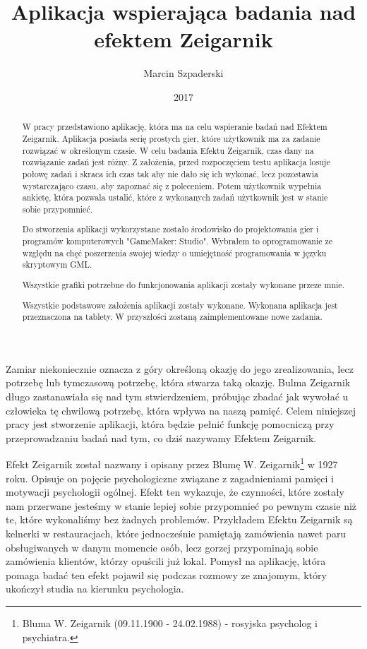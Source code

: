\documentclass[openright]{xmgr}
\author   {Marcin Szpaderski}
\title    {Aplikacja wspierająca badania nad efektem Zeigarnik}
\date     {2017}
\begin{document}
\begin{abstract}
W pracy przedstawiono aplikację, która ma na celu wspieranie badań nad Efektem Zeigarnik. Aplikacja posiada serię prostych gier, które użytkownik ma za zadanie rozwiązać w określonym czasie. W celu badania Efektu Zeigarnik, czas dany na rozwiązanie zadań jest różny. Z założenia, przed rozpoczęciem testu aplikacja losuje połowę zadań i skraca ich czas tak aby nie dało się ich wykonać, lecz pozostawia wystarczająco czasu, aby zapoznać się z poleceniem. Potem użytkownik wypełnia ankietę, która pozwala ustalić, które z wykonanych zadań użytkownik jest w stanie sobie przypomnieć.

Do stworzenia aplikacji wykorzystane zostało środowisko do projektowania gier i programów komputerowych "GameMaker: Studio".  Wybrałem to oprogramowanie ze względu na chęć poszerzenia swojej wiedzy o umiejętność programowania w języku skryptowym GML. 

Wszystkie grafiki potrzebne do funkcjonowania aplikacji zostały wykonane przeze mnie.

Wszystkie podstawowe założenia aplikacji zostały wykonane. Wykonana aplikacja jest przeznaczona na tablety. W przyszłości zostaną zaimplementowane nowe zadania.


\end{abstract}


\maketitle

\introduction

Zamiar niekoniecznie oznacza z góry określoną okazję do jego zrealizowania, lecz potrzebę lub tymczasową potrzebę, która stwarza taką okazję. Bulma Zeigarnik długo zastanawiała się nad tym stwierdzeniem, próbując zbadać jak wywołać u człowieka tę chwilową potrzebę, która wpływa na naszą pamięć. Celem niniejszej pracy jest stworzenie aplikacji, która będzie pełnić funkcję pomocniczą przy przeprowadzaniu badań nad tym, co dziś nazywamy Efektem Zeigarnik.

Efekt Zeigarnik został nazwany i opisany przez Blumę W. Zeigarnik\footnote{Bluma W. Zeigarnik (09.11.1900 - 24.02.1988) - rosyjska psycholog i psychiatra.} w 1927 roku. Opisuje on pojęcie psychologiczne związane z zagadnieniami pamięci i motywacji psychologii ogólnej. Efekt ten wykazuje, że czynności, które zostały nam przerwane jesteśmy w stanie lepiej sobie przypomnieć po pewnym czasie niż te, które wykonaliśmy bez żadnych problemów. Przykładem Efektu Zeigarnik są kelnerki w restauracjach, które jednocześnie pamiętają zamówienia nawet paru obsługiwanych w danym momencie osób, lecz gorzej przypominają sobie zamówienia klientów, którzy opuścili już lokal. Pomysł na aplikację, która pomaga badać ten efekt pojawił się podczas rozmowy ze znajomym, który ukończył studia na kierunku psychologia.
\end{document}
